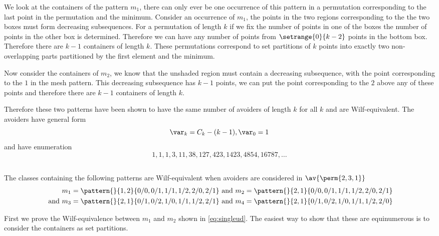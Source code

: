 We look at the containers of the pattern \(m_1\), there can only ever
be one occurrence of this pattern in a permutation corresponding to
the last point in the permutation and the minimum. Consider an occurrence of \(m_1\),
the points in the two regions corresponding to the the two boxes must form decreasing
subsequences.
For a permutation of length \(k\) if we fix the number of points in
one of the boxes the number of points in the other box is determined.
Therefore we can have any number of points from \(\setrange{0}{k-2}\)
points in the bottom box. Therefore there are \(k-1\) containers of
length \(k\). These permutations correspond to set partitions of \(k\)
points into exactly two non-overlapping parts partitioned by the first
element and the minimum.

Now consider the containers of \(m_2\), we know that the unshaded region
must contain a decreasing subsequence, with the point corresponding to
the \(1\) in the mesh pattern. This decreasing subsequence has \(k-1\)
points, we can put the point corresponding to the \(2\) above any of these
points and therefore there are \(k-1\) containers of length \(k\).

Therefore these two patterns have been shown to have the same number of
avoiders of length \(k\) for all \(k\) and are Wilf-equivalent.
The avoiders have general form
\begin{equation*}
  \var_k = C_k - (k-1), \var_0 = 1
\end{equation*}
and have enumeration
\begin{equation*}
    1, 1, 1, 3, 11, 38, 127, 423, 1423, 4854, 16787,\dotsc
\end{equation*}

\subsection{}
\nextvar
The classes containing the following patterns are Wilf-equivalent
when avoiders are considered in \(\av{\perm{2,3,1}}\)
\begin{align}
    m_1 = \pattern{}{1,2}{0/0,0/1,1/1,1/2,2/0,2/1} &\text{ and }
    m_2 = \pattern{}{2,1}{0/0,0/1,1/1,1/2,2/0,2/1} \label{eq:singleud}\\
    \text{ and }
    m_3 = \pattern{}{2,1}{0/1,0/2,1/0,1/1,1/2,2/1} &\text{ and }
    m_4 = \pattern{}{2,1}{0/1,0/2,1/0,1/1,1/2,2/0} \label{eq:other}
\end{align}

First we prove the Wilf-equivalence between \(m_1\) and \(m_2\) shown in
\eqref{eq:singleud}. The easiest way to
show that these are equinumerous is to consider the containers as set partitions.

